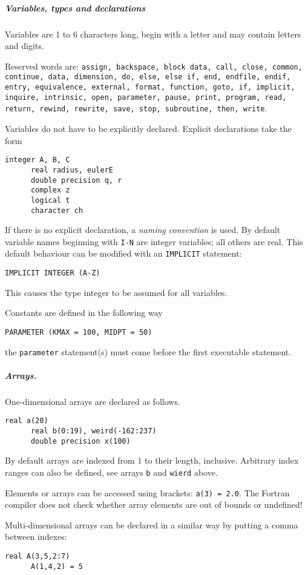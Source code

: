 \subparagraph{Variables, types and declarations}
Variables are 1 to 6 characters long, begin with a letter and may contain letters and digits.

Reserved words are: \texttt{assign, backspace, block data, call, close, common, continue, data, dimension, do, else, else if, end, endfile, endif, entry, equivalence, external, format, function, goto, if, implicit, inquire, intrinsic, open, parameter, pause, print, program, read, return, rewind, rewrite, save, stop, subroutine, then, write}.

Variables do not have to be explicitly declared. Explicit declarations take the form
\begin{lstlisting}[language={[77]fortran}, style=snippet]
      integer A, B, C
      real radius, eulerE
      double precision q, r
      complex z
      logical t
      character ch
\end{lstlisting}
If there is no explicit declaration, a \textit{naming convention} is used. By default variable names beginning with \texttt{I-N} are integer variables; all others are real. This default behaviour can be modified with an \texttt{IMPLICIT} statement:
\begin{lstlisting}[language={[77]fortran}, style=snippet]
      IMPLICIT INTEGER (A-Z)
\end{lstlisting}
This causes the type integer to be assumed for all variables.

Constants are defined in the following way
\begin{lstlisting}[language={[77]fortran}, style=snippet]
      PARAMETER (KMAX = 100, MIDPT = 50)
\end{lstlisting}
the \texttt{parameter} statement(s) must come before the first executable statement.

\subparagraph{Arrays.} One-dimensional arrays are declared as follows.
\begin{lstlisting}[language={[77]fortran}, style=snippet]
      real a(20)
      real b(0:19), weird(-162:237)
      double precision x(100)
\end{lstlisting}
By default arrays are indexed from $1$ to their length, inclusive. Arbitrary index ranges can also be defined, see arrays \texttt{b} and \texttt{wierd} above.

Elements or arrays can be accessed using brackets: \texttt{a(3) = 2.0}. The Fortran compiler does not check whether array elements are out of bounds or undefined!

Multi-dimensional arrays can be declared in a similar way by putting a comma between indexes:
\begin{lstlisting}[language={[77]fortran}, style=snippet]
      real A(3,5,2:7)
      A(1,4,2) = 5
\end{lstlisting}

